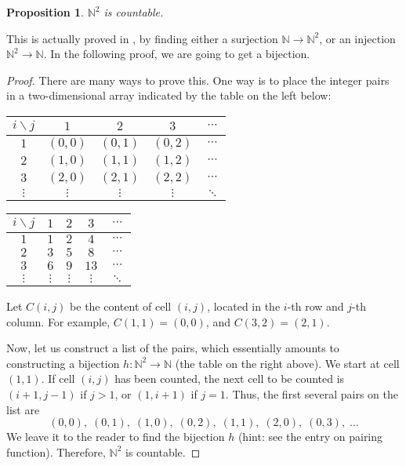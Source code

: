 \documentclass[12pt]{article}
\newtheorem{prop}{Proposition}
\begin{document}

\begin{prop} $\mathbb{N}^2$ is countable. \end{prop}

This is actually proved in , by finding either a surjection $\mathbb{N}\to \mathbb{N}^2$, or an injection $\mathbb{N}^2 \to \mathbb{N}$.  In the following proof, we are going to get a bijection.

\begin{proof}
There are many ways to prove this.  One way is to place the integer pairs in a two-dimensional array indicated by the table on the left below:
\begin{center}
\begin{tabular}{ c|c c c c }
$i \backslash j$ & $1$ & $2$ & $3$ & $\cdots$ \\
\hline
$1$ & $(0,0)$ & $(0,1)$ & $(0,2)$ & $\cdots$ \\
$2$ & $(1,0)$ & $(1,1)$ & $(1,2)$ & $\cdots$ \\
$3$ & $(2,0)$ & $(2,1)$ & $(2,2)$ & $\cdots$ \\
$\vdots$ & $\vdots$ & $\vdots$ & $\vdots$ & $\ddots$ 
\end{tabular}
\hspace{1cm}
\begin{tabular}{ c|c c c c }
$i \backslash j$ & $1$ & $2$ & $3$ & $\cdots$ \\
\hline
$1$ & $1$ & $2$ & $4$ & $\cdots$ \\
$2$ & $3$ & $5$ & $8$ & $\cdots$ \\
$3$ & $6$ & $9$ & $13$ & $\cdots$ \\
$\vdots$ & $\vdots$ & $\vdots$ & $\vdots$ & $\ddots$ 
\end{tabular}
\end{center}
Let $C(i,j)$ be the content of cell $(i,j)$, located in the $i$-th row and $j$-th column.  For example, $C(1,1)=(0,0)$, and $C(3,2)=(2,1)$.

Now, let us construct a list of the pairs, which essentially amounts to constructing a bijection $h: \mathbb{N}^2 \to \mathbb{N}$ (the table on the right above).  We start at cell $(1,1)$.  If cell $(i,j)$ has been counted, the next cell to be counted is $(i+1,j-1)$ if $j>1$, or $(1,i+1)$ if $j=1$.  Thus, the first several pairs on the list are
$$(0,0),\; (0,1),\; (1,0),\; (0,2),\; (1,1),\; (2,0),\; (0,3),\; \ldots$$
We leave it to the reader to find the bijection $h$ (hint: see the entry on pairing function).  Therefore, $\mathbb{N}^2$ is countable.  
\end{proof}
\end{document}
